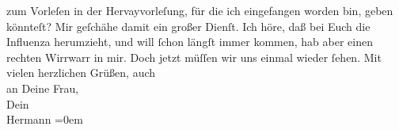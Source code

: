 \begin{ledgroupsized}[t]{13cm}
               zum Vorleſen in der Hervayvorleſung, für die
               ich eingefangen worden bin, geben könnteſt? Mir geſchähe damit ein großer Dienſt.\pend
           \pstart
           Ich höre, daß bei Euch die Influenza herumzieht, und will ſchon längſt immer kommen,
               hab aber einen rechten Wirrwarr in mir. Doch jetzt müſſen wir uns einmal wieder
               ſehen.\pend
           \pstart
           Mit vielen herzlichen Grüßen, auch{\\[\baselineskip]}an Deine Frau,{\\[\baselineskip]}Dein{\\[\baselineskip]}\spacefill\mbox{Hermann}\pend
           \leftskip=0em{}
         
         \endnumbering{}\end{ledgroupsized}  \newcommand{\dateiname}{L01492}\newcommand{\titel}{Hermann Bahr an Arthur Schnitzler, 21. 1. 1905}\newcommand{\editorInnen}{ Kurt Ifkovits,  Martin Anton Müller}
      